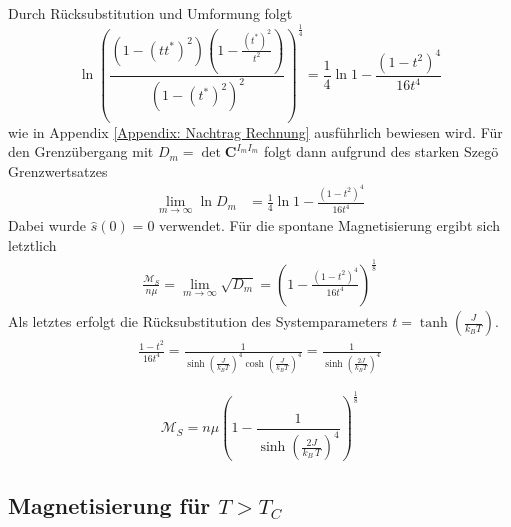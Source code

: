 Durch Rücksubstitution und Umformung folgt 
\begin{equation} \label{eq: Missing Equation 2}
\ln{\left(\frac{(1-(tt^*)^2)(1-\frac{(t^*)^{2}}{t^{2}})}{(1-(t^*)^2)^2}\right)^{\frac{1}{4}}} = \frac{1}{4} \ln{1 - \frac{(1-t^2)^4}{16t^4}}
\end{equation}
wie in Appendix \ref{Appendix: Nachtrag Rechnung} ausführlich bewiesen wird. Für den Grenzübergang mit $D_m = \det{\bm{C}^{I_m I_m}}$ folgt dann aufgrund des starken Szegö Grenzwertsatzes
\begin{align}  \nonumber
 \lim_{m \rightarrow \infty} \ln{D_m} & = \frac{1}{4} \ln{1 - \frac{(1-t^2)^4}{16t^4}}
 \end{align}
Dabei wurde $\hat{s}(0)= 0$ verwendet. Für die spontane Magnetisierung ergibt sich letztlich   
\begin{align} \nonumber
\frac{\mathcal{M}_S}{n\mu} =  \lim_{m \rightarrow \infty} \sqrt{D_m} =  \left(1 - \frac{(1-t^2)^4}{16t^4}\right)^{\frac{1}{8}}
 \end{align}
Als letztes erfolgt die Rücksubstitution des Systemparameters $t=\tanh(\frac{J}{k_B T})$. 
\begin{align} \nonumber
\frac{1-t^2}{16t^4} = \frac{1}{\sinh(\frac{J}{k_B T})^4 \cosh(\frac{J}{k_B T})^4} = \frac{1}{\sinh(\frac{2J}{k_B T})^4} 
 \end{align}
\begin{grayframe}[frametitle = {Spontane Magnetisierung für $T < T_C$}]
\begin{equation} \label{eq: result magnetisation low}
\mathcal{M}_S = n\mu\left(1-\frac{1}{\sinh(\frac{2J}{k_B\,T})^4}\right)^{\frac{1}{8}}
\end{equation}
\end{grayframe}

\subsection{Magnetisierung für $T > T_C$}

